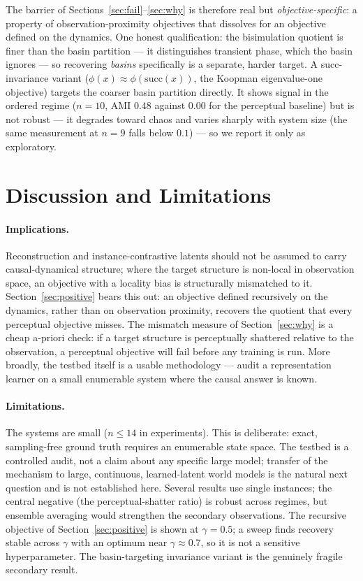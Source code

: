 \documentclass[11pt]{article}
\newcommand{\succf}{\mathrm{succ}}
\begin{document}
The barrier of Sections~\ref{sec:fail}--\ref{sec:why} is therefore real but
\emph{objective-specific}: a property of observation-proximity objectives that
dissolves for an objective defined on the dynamics. One honest qualification:
the bisimulation quotient is finer than the basin partition --- it distinguishes
transient phase, which the basin ignores --- so recovering \emph{basins}
specifically is a separate, harder target. A succ-invariance variant
($\phi(x)\approx\phi(\succf(x))$, the Koopman eigenvalue-one objective)
targets the coarser basin partition directly. It shows signal in the ordered
regime ($n{=}10$, AMI $0.48$ against $0.00$ for the perceptual baseline) but
is not robust --- it degrades toward chaos and varies sharply with system size
(the same measurement at $n{=}9$ falls below $0.1$) --- so we report it only
as exploratory.

\section{Discussion and Limitations}

\paragraph{Implications.}
Reconstruction and instance-contrastive latents should not be assumed to carry
causal-dynamical structure; where the target structure is non-local in
observation space, an objective with a locality bias is structurally
mismatched to it. Section~\ref{sec:positive} bears this out: an objective
defined recursively on the dynamics, rather than on observation proximity,
recovers the quotient that every perceptual objective misses.
The mismatch measure of Section~\ref{sec:why} is a cheap a-priori check: if a
target structure is perceptually shattered relative to the observation, a
perceptual objective will fail before any training is run. More broadly, the
testbed itself is a usable methodology --- audit a representation learner on a
small enumerable system where the causal answer is known.

\paragraph{Limitations.}
The systems are small ($n \le 14$ in experiments). This is deliberate: exact,
sampling-free ground truth requires an enumerable state space. The testbed is
a controlled audit, not a claim about any specific large model; transfer of
the mechanism to large, continuous, learned-latent world models is the natural
next question and is not established here. Several results use single
instances; the central negative (the perceptual-shatter ratio) is robust
across regimes, but ensemble averaging would strengthen the secondary
observations. The recursive objective of Section~\ref{sec:positive} is shown
at $\gamma{=}0.5$; a sweep finds recovery stable across $\gamma$ with an
optimum near $\gamma\approx0.7$, so it is not a sensitive hyperparameter. The
basin-targeting invariance variant is the genuinely fragile secondary result.
\end{document}
